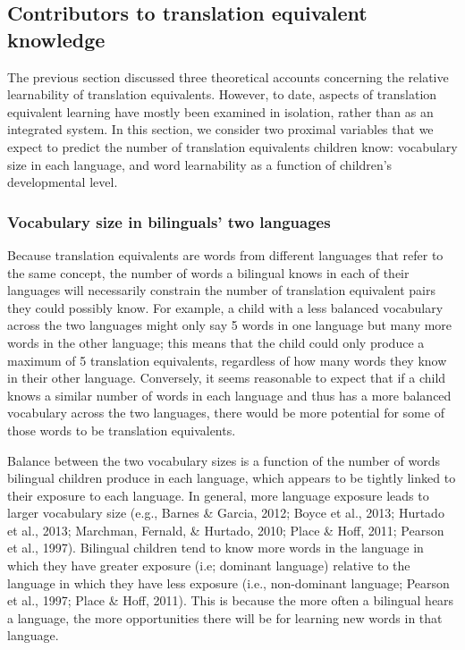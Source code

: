 \documentclass[
  english,
  ,man,floatsintext]{apa6}
\begin{document}
\hypertarget{contributors-to-translation-equivalent-knowledge}{%
\subsection{Contributors to translation equivalent knowledge}\label{contributors-to-translation-equivalent-knowledge}}

The previous section discussed three theoretical accounts concerning the relative learnability of translation equivalents. However, to date, aspects of translation equivalent learning have mostly been examined in isolation, rather than as an integrated system. In this section, we consider two proximal variables that we expect to predict the number of translation equivalents children know: vocabulary size in each language, and word learnability as a function of children's developmental level.

\hypertarget{vocabulary-size-in-bilinguals-two-languages}{%
\subsubsection{Vocabulary size in bilinguals' two languages}\label{vocabulary-size-in-bilinguals-two-languages}}

Because translation equivalents are words from different languages that refer to the same concept, the number of words a bilingual knows in each of their languages will necessarily constrain the number of translation equivalent pairs they could possibly know. For example, a child with a less balanced vocabulary across the two languages might only say 5 words in one language but many more words in the other language; this means that the child could only produce a maximum of 5 translation equivalents, regardless of how many words they know in their other language. Conversely, it seems reasonable to expect that if a child knows a similar number of words in each language and thus has a more balanced vocabulary across the two languages, there would be more potential for some of those words to be translation equivalents.

Balance between the two vocabulary sizes is a function of the number of words bilingual children produce in each language, which appears to be tightly linked to their exposure to each language. In general, more language exposure leads to larger vocabulary size (e.g., Barnes \& Garcia, 2012; Boyce et al., 2013; Hurtado et al., 2013; Marchman, Fernald, \& Hurtado, 2010; Place \& Hoff, 2011; Pearson et al., 1997). Bilingual children tend to know more words in the language in which they have greater exposure (i.e; dominant language) relative to the language in which they have less exposure (i.e., non-dominant language; Pearson et al., 1997; Place \& Hoff, 2011). This is because the more often a bilingual hears a language, the more opportunities there will be for learning new words in that language.
\end{document}
